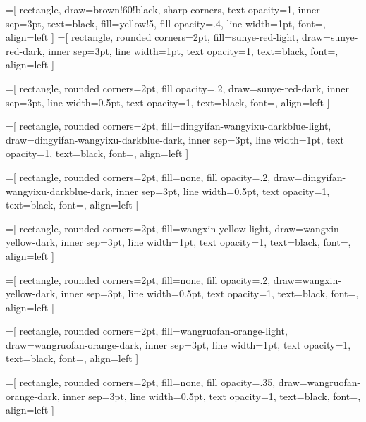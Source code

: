 \newcommand{\TLM}{Large Model Safety}
=[
    rectangle,
    draw=brown!60!black,
    sharp corners,
    text opacity=1,
    inner sep=3pt, 
    text=black,
    fill=yellow!5,
    fill opacity=.4, 
    line width=1pt,
    font=\tiny,
    align=left
]
=[
    rectangle,
    rounded corners=2pt, 
    fill=sunye-red-light, 
    draw=sunye-red-dark,
    inner sep=3pt, 
    line width=1pt,
    text opacity=1,
    text=black, 
    font=\tiny, 
    align=left 
]

=[
    rectangle,
    rounded corners=2pt, 
    fill opacity=.2,
    draw=sunye-red-dark,
    inner sep=3pt, 
    line width=0.5pt,
    text opacity=1,
    text=black, 
    font=\tiny, 
    align=left 
]

=[
    rectangle,
    rounded corners=2pt, 
    fill=dingyifan-wangyixu-darkblue-light, 
    draw=dingyifan-wangyixu-darkblue-dark, 
    inner sep=3pt, 
    line width=1pt,
    text opacity=1,
    text=black, 
    font=\tiny, 
    align=left 
]

=[
    rectangle,
    rounded corners=2pt, 
    fill=none, 
    fill opacity=.2,
    draw=dingyifan-wangyixu-darkblue-dark,
    inner sep=3pt, 
    line width=0.5pt,
    text opacity=1,
    text=black, 
    font=\tiny, 
    align=left 
]

=[
    rectangle,
    rounded corners=2pt, 
    fill=wangxin-yellow-light, 
    draw=wangxin-yellow-dark, 
    inner sep=3pt, 
    line width=1pt,
    text opacity=1,
    text=black, 
    font=\tiny, 
    align=left 
]

=[
    rectangle,
    rounded corners=2pt, 
    fill=none, 
    fill opacity=.2,
    draw=wangxin-yellow-dark,
    inner sep=3pt, 
    line width=0.5pt,
    text opacity=1,
    text=black, 
    font=\tiny, 
    align=left 
]

=[
    rectangle,
    rounded corners=2pt, 
    fill=wangruofan-orange-light, 
    draw=wangruofan-orange-dark, 
    inner sep=3pt, 
    line width=1pt,
    text opacity=1,
    text=black, 
    font=\fontsize{5pt}{7pt}\selectfont, 
    align=left 
]

=[
    rectangle,
    rounded corners=2pt, 
    fill=none, 
    fill opacity=.35,
    draw=wangruofan-orange-dark,
    inner sep=3pt, 
    line width=0.5pt,
    text opacity=1,
    text=black, 
    font=\tiny, 
    align=left 
]


